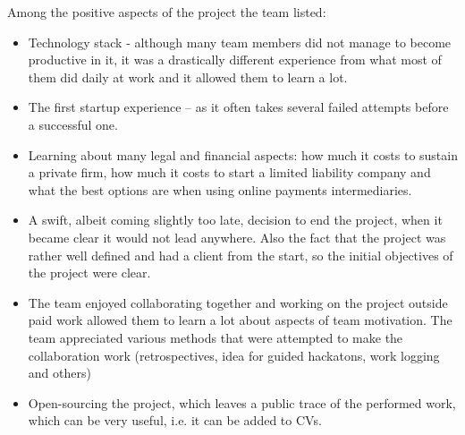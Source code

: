\documentclass{article}
\begin{document}
Among the positive aspects of the project the team listed:
\begin{itemize}
\item Technology stack - although many team members did not manage to become productive in it, it was a drastically different experience from what most of them did daily at work and it allowed them to learn a lot.
\item The first startup experience – as it often takes several failed attempts before a successful one.
\item Learning about many legal and financial aspects: how much it costs to sustain a private firm, how much it costs to start a limited liability company and what the best options are when using online payments intermediaries.
\item A swift, albeit coming slightly too late, decision to end the project, when it became clear it would not lead anywhere. Also the fact that the project was rather well defined and had a client from the start, so the initial objectives of the project were clear.
\item The team enjoyed collaborating together and working on the project outside paid work allowed them to learn a lot about aspects of team motivation. The team appreciated various methods that were attempted to make the collaboration work (retrospectives, idea for guided hackatons, work logging and others)
\item Open-sourcing the project, which leaves a public trace of the performed work, which can be very useful, i.e. it can be added to CVs.
\end{itemize}
\end{document}
